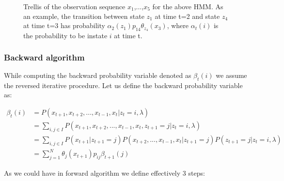 \begin{figure}[htbp]
\begin{center}
\end{center}
\caption{Trellis of the observation sequence $x_1$,...,$x_5$ for the above HMM. As an example, the transition between state $z_1$ at time t=2 and state $z_4$ at time t=3 has probability $\alpha_2(z_1)p_{14}\theta_{z_4}(x_3)$, where $\alpha_t(i)$ is the probability to be instate $i$ at time t.}
\end{figure}

\pagebreak

\subsubsection{Backward algorithm}

While computing the backward probability variable denoted as $\beta_t(i)$ we assume the reversed iterative procedure. Let us define the backward probability variable as:

\begin{align}
\beta_t(i) &= P(x_{t+1},x_{t+2},...,x_{t-1},x_t|z_t=i ,\lambda) \\ \nonumber
&= \sum_{i,j \in I} P(x_{t+1},x_{t+2},...,x_{t-1},x_t,z_{t+1}=j|z_t=i ,\lambda)   \\ \nonumber
&= \sum_{i,j \in I} P(x_{t+1}|z_{t+1}=j) P(x_{t+2},...,x_{t-1},x_t|z_{t+1}=j) P(z_{t+1}=j|z_{t}=i,\lambda) \\ \nonumber
&= \sum_{j=1}^N \theta_j(x_{t+1})p_{ij} \beta_{t+1}(j)
\end{align}

As we could have in forward algorithm we define effectively 3 steps:

